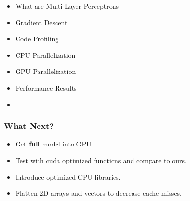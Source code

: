 \begin{frame}
\begin{itemize}
    \item What are Multi-Layer Perceptrons
    \item Gradient Descent
    \item Code Profiling
    \item CPU Parallelization
    \item GPU Parallelization
    \item Performance Results 
    \item \textbf{\color{red}{Next Steps}}
\end{itemize}
\end{frame}

\begin{frame}
    \frametitle{What Next?}
    \begin{itemize}
        \item Get \textbf{full} model into GPU.
        \item Test with cuda optimized functions and compare to ours. 
        \item Introduce optimized CPU libraries.
        \item Flatten 2D arrays and vectors to decrease cache misses. 
    \end{itemize}
\end{frame}
